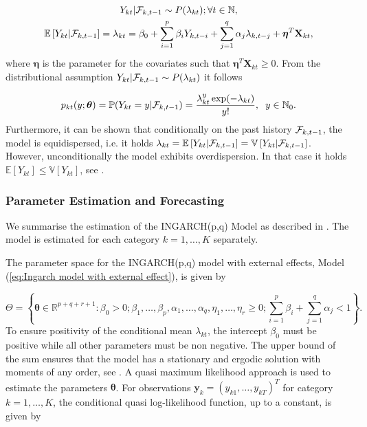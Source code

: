 \begin{equation}
\begin{gathered}
\label{eq:Ingarch model with external effect}
Y_{kt} | \mathcal{F}_{k,t-1} \sim P(\lambda_{kt}); \forall t \in \mathbb{N}, \\
\mathbb{E}\left[Y_{kt} | \mathcal{F}_{k,t-1} \right] = \lambda_{kt} = \beta_0 + \sum_{i=1}^p\beta_i Y_{k,t-i} + \sum_{j=1}^q\alpha_j \lambda_{k,t-j} + \bm{\eta}^T\textbf{X}_{kt},
\end{gathered}
\end{equation}
%
where $\bm{\eta}$ is the parameter for the covariates such that $\bm{\eta}^T\textbf{X}_{kt} \geq 0$.
From the distributional assumption $Y_{kt} | \mathcal{F}_{k,t-1} \sim P(\lambda_{kt})$ it follows

\begin{equation}
p_{kt}(y;\bm{\theta})=\mathbb{P}(Y_{kt}=y | \mathcal{F}_{k,t-1}) = \frac{\lambda_{kt}^y \exp(-\lambda_{kt})}{y!}, \hspace{0.2cm} y \in \mathbb{N}_0.
\label{eq:Ingarch Distribution}
\end{equation}
%
Furthermore, it can be shown that conditionally on the past history $\mathcal{F}_{k,t-1}$, the model is equidispersed, i.e. it holds $\lambda_{kt} = \mathbb{E}\left[Y_{kt} | \mathcal{F}_{k,t-1}\right] = \mathbb{V}\left[Y_{kt} | \mathcal{F}_{k,t-1}\right]$. However, unconditionally the model exhibits overdispersion. In that case it holds $\mathbb{E}\left[Y_{kt}\right] \leq \mathbb{V}\left[Y_{kt}\right] $, see \textcite{Heinen:2003}. 

\subsubsection{Parameter Estimation and Forecasting}
\label{sec: Estimation of the Ingarch Model}

We summarise the estimation of the INGARCH(p,q) Model as described in \textcite{Liboschik:2016}. The model is estimated for each category $k=1,\ldots,K$ separately. 

The parameter space for the INGARCH(p,q) model with external effects, Model (\ref{eq:Ingarch model with external effect}), is given by 

\begin{equation}
\Theta = \left\{ \bm{\theta} \in \mathbb{R}^{p+q+r+1}: \beta_0 > 0; \beta_1,\ldots,\beta_p,\alpha_1,\ldots,\alpha_q,\eta_1,\ldots,\eta_r \geq 0; \sum_{i=1}^p\beta_i + \sum_{j=1}^q\alpha_j < 1 \right\}.
\label{eq:Ingarch parameter space}
\end{equation}
%
To ensure positivity of the conditional mean $\lambda_{kt}$, the intercept $\beta_0$ must be positive while all other parameters must be non negative. The upper bound of the sum ensures that the model has a stationary and ergodic solution with moments of any order, see \textcite{Ferland:2006,Fokianos:2009,Doukhan:2012}. A quasi maximum likelihood approach is used to estimate the parameters $\bm{\theta}$. 
For observations $\textbf{y}_k = \left(y_{k1},\ldots,y_{kT}\right)^T$ for category $k=1,\ldots,K$, the conditional quasi log-likelihood function, up to a constant, is given by

